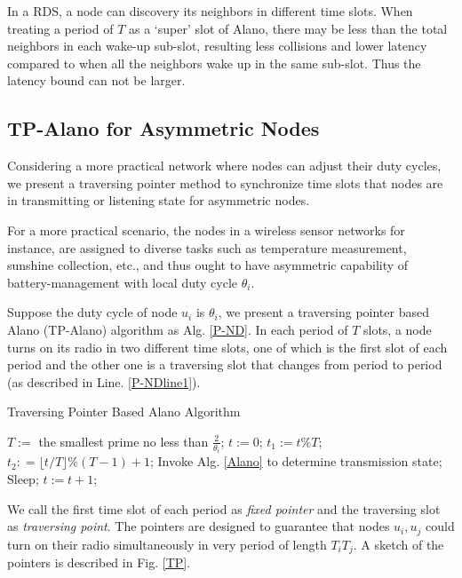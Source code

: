 \begin{remark}
In a RDS, a node can discovery its neighbors in different time slots. When treating a period of $T$ as a  `super' slot of Alano, 
there may be less than the total neighbors in each wake-up sub-slot,
resulting less collisions and lower latency compared to when all the neighbors wake up in the same sub-slot.
Thus the latency bound can not be larger.
\end{remark}


\subsection{TP-Alano for Asymmetric Nodes}


Considering a more practical network where nodes can adjust their duty cycles, we present a traversing pointer method to synchronize time slots that nodes are in transmitting or listening state for asymmetric nodes.


For a more practical scenario, the nodes in a wireless sensor networks
for instance, are assigned to diverse tasks such as temperature measurement,
sunshine collection, etc., and thus ought to have asymmetric capability of
battery-management with local duty cycle $\theta_i$.

Suppose the duty cycle of node $u_i$ is $\theta_i$, we present a traversing pointer based Alano (TP-Alano) algorithm as Alg. \ref{P-ND}.
In each period of $T$ slots, a node turns on its radio in two different time slots, one of which is the
first slot of each period and the other one is a traversing slot that changes from period to period (as described in Line. \ref{P-NDline1}).

\begin{algorithm}[!h]
\caption{Traversing Pointer Based Alano Algorithm}
\label{P-ND}
\begin{algorithmic}[1]
\STATE $T :=$ the smallest prime no less than $\frac{2}{\theta_i}$; $t := 0$;
	\STATE $t_1 := t \% T$;
	\STATE $t_2 : =\lfloor t / T \rfloor \% (T - 1) +1$;\label{P-NDline1}
    		\STATE Invoke Alg. \ref{Alano} to determine transmission state;
	\ELSE
    		\STATE Sleep;
	\ENDIF
	\STATE $t := t + 1$;
\ENDWHILE
\end{algorithmic}
\end{algorithm}

We call the first time slot of each period as \emph{fixed pointer} and the traversing
slot as \emph{traversing point}. The pointers are designed to guarantee that nodes $u_i, u_j$
could turn on their radio simultaneously in very period of length $T_i T_j$. A sketch of the pointers is described in Fig. \ref{TP}.

